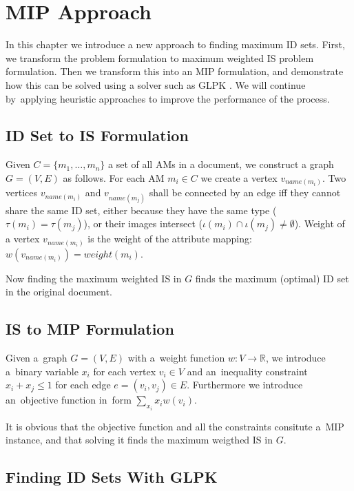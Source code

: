 \chapter{MIP Approach}
\label{chapter-mip}

In this chapter we introduce a new approach to finding maximum ID sets. First, we transform the problem formulation to maximum weighted IS problem formulation. Then we transform this into an MIP formulation, and demonstrate how this can be solved using a solver such as GLPK \cite{glpk}. 
We will continue by~applying heuristic approaches to improve the performance of the process.

\section{ID Set to IS Formulation}

Given $C = \{m_1, \ldots, m_n\}$ a set of all AMs in a document, we construct a graph $G = (V,E)$ as follows. For each AM $m_i \in C$ we create a vertex $v_{name(m_i)}$. Two vertices $v_{name(m_i)}$ and $v_{name(m_j)}$ shall be connected by an edge iff they cannot share the same ID set, either because they have the same type ($\tau(m_i) = \tau(m_j)$), or their images intersect ($\iota(m_i) \cap \iota(m_j) \neq \emptyset$). Weight of a vertex $v_{name(m_i)}$ is the weight of the attribute mapping: $w(v_{name(m_i)}) = weight(m_i)$.

Now finding the maximum weighted IS in $G$ finds the maximum (optimal) ID set in the original document.

\section{IS to MIP Formulation}

Given a~graph $G = (V,E)$ with a~weight function $w: V \rightarrow \mathbb{R}$, we introduce a~binary variable $x_i$ for each vertex $v_i \in V$ and an~inequality constraint $x_i + x_j \leq 1$ for each edge $e = (v_i, v_j) \in E$. Furthermore we introduce an~objective function in~form $\sum_{x_i} x_i w(v_i)$.

It is obvious that the objective function and all the constraints consitute a~MIP instance, and that solving it finds the maximum weigthed IS in $G$.

\section{Finding ID Sets With GLPK}
\label{section-mip-glpk}

